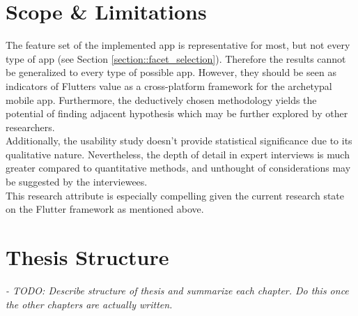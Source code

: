 \section{Scope \& Limitations}
The feature set of the implemented app is representative for most, but not every type of app (see Section \ref{section::facet_selection}). 
Therefore the results cannot be generalized to every type of possible app. 
However, they should be seen as indicators of Flutters value as a cross-platform framework for the 
archetypal mobile app. 
Furthermore, the deductively chosen methodology yields the potential of finding adjacent hypothesis which may be
further explored by other researchers.\\
Additionally, the usability study doesn't provide statistical significance due to its qualitative nature. Nevertheless, the depth of detail
in expert interviews is much greater compared to quantitative methods, and unthought of considerations may be suggested by the interviewees.\\
This research attribute is especially compelling given the current research state on the Flutter framework as mentioned above. 

\section{Thesis Structure}
\textit{- TODO: Describe structure of thesis and summarize each chapter. Do this once the other chapters are actually written.}
